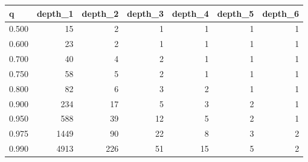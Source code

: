 \begin{tabular}{lrrrrrr}
\toprule
q & depth\_1 & depth\_2 & depth\_3 & depth\_4 & depth\_5 & depth\_6
 \\
\midrule
0.500 & 15 & 2 & 1 & 1 & 1 & 1
 \\
0.600 & 23 & 2 & 1 & 1 & 1 & 1
 \\
0.700 & 40 & 4 & 2 & 1 & 1 & 1
 \\
0.750 & 58 & 5 & 2 & 1 & 1 & 1
 \\
0.800 & 82 & 6 & 3 & 2 & 1 & 1
 \\
0.900 & 234 & 17 & 5 & 3 & 2 & 1
 \\
0.950 & 588 & 39 & 12 & 5 & 2 & 1
 \\
0.975 & 1449 & 90 & 22 & 8 & 3 & 2
 \\
0.990 & 4913 & 226 & 51 & 15 & 5 & 2
 \\
\bottomrule
\end{tabular}
